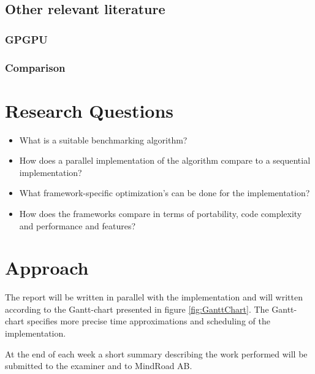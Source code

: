 \documentclass{article}
\begin{document}
\subsection{Other relevant literature}

\subsubsection{GPGPU}
\cite{owens2007survey}
\cite{DirectComputeGUIDE}
\cite{cederman2009gpu}
\cite{chen2009fast}
\cite{thompson2002gpgpu}


\subsubsection{Comparison}
\cite{karimi2010performance}
\cite{fang2011comprehensive}
\cite{Torbjorn}
\cite{ciznicki2012benchmarking}
\cite{CUDAtoOpenCL}
\cite{oliveira2011comparing}




\section{Research Questions}
\begin{itemize}
    \item What is a suitable benchmarking algorithm?
    \item How does a parallel implementation of the algorithm compare to a sequential implementation?
    \item What framework-specific optimization's can be done for the implementation?
    \item How does the frameworks compare in terms of portability, code complexity and performance and features?
\end{itemize}


\section{Approach}
The report will be written in parallel with the implementation and will written according to the Gantt-chart presented in figure \ref{fig:GanttChart}. The Gantt-chart specifies more precise time approximations and scheduling of the implementation.

At the end of each week a short summary describing the work performed will be submitted to the examiner and to MindRoad AB.
\end{document}
